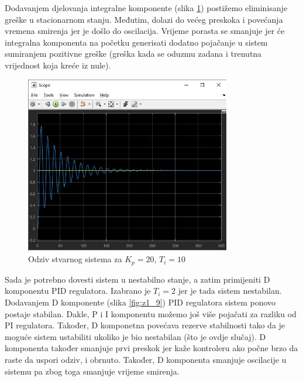 Dodavanjem djelovanja integralne komponente (slika \ref{fig:z1_8}) postižemo eliminisanje greške u stacionarnom stanju. Međutim, dolazi do većeg preskoka i povećanja vremena smirenja jer je došlo do oscilacija. Vrijeme porasta se smanjuje jer će integralna komponenta na početku generisati dodatno pojačanje u sistem sumiranjem pozitivne greške (greška kada se oduzmu zadana i trenutna vrijednost koja kreće iz nule).

\begin{figure} [H]
  \centering
  \includegraphics[width=0.8\textwidth]{z1_8}
  \caption{Odziv stvarnog sistema za $K_p=20$, $T_i=10$}
  \label{fig:z1_8}
\end{figure}

Sada je potrebno dovesti sistem u nestabilno stanje, a zatim primijeniti D komponentu PID regulatora. Izabrano je $T_i=2$ jer je tada sistem nestabilan. Dodavanjem D komponente (slika \ref{fig:z1_9}) PID regulatora sistem ponovo postaje stabilan. Dakle, P i I komponentu možemo još više pojačati za razliku od PI regulatora. Također, D komponetna povećava rezerve stabilnosti tako da je moguće sistem ustabiliti ukoliko je bio nestabilan (što je ovdje slučaj). D komponenta također smanjuje prvi preskok jer kaže kontroleru ako počne brzo da raste da uspori odziv, i obrnuto. Također, D komponenta smanjuje oscilacije u sistemu pa zbog toga smanjuje vrijeme smirenja.

